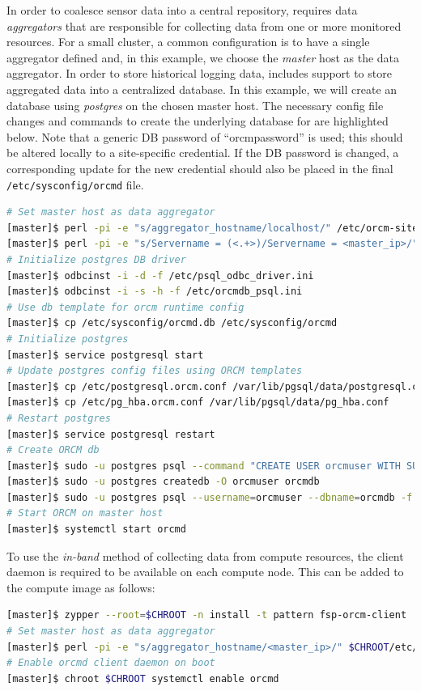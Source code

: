 \documentclass[letterpaper]{article}
\begin{document}
In order to coalesce sensor data into a central repository, \ORCM{} requires
data {\em aggregators} that are responsible for collecting data from one or
more monitored resources. For a small cluster, a common configuration is to
have a single aggregator defined and, in this example, we choose the {\em master} host
as the data aggregator. In order to store historical logging data, \ORCM{}
includes support to store aggregated data into a centralized database. In this
example, we will create an \ORCM{} database using {\em postgres} on the chosen
master host. The necessary config file changes and commands to create the
underlying database for \ORCM{} are highlighted below. Note that a generic DB
password of ``orcmpassword'' is used; this should be altered locally to a
site-specific credential. If the DB password is changed, a corresponding update
for the new credential should also be placed in the final
\texttt{/etc/sysconfig/orcmd} file.

\begin{lstlisting}[language=bash,keywords={},upquote=true]
# Set master host as data aggregator
[master]$ perl -pi -e "s/aggregator_hostname/localhost/" /etc/orcm-site.xml
[master]$ perl -pi -e "s/Servername = (<.+>)/Servername = <master_ip>/" /etc/orcmdb_psql.ini
# Initialize postgres DB driver
[master]$ odbcinst -i -d -f /etc/psql_odbc_driver.ini
[master]$ odbcinst -i -s -h -f /etc/orcmdb_psql.ini 
# Use db template for orcm runtime config
[master]$ cp /etc/sysconfig/orcmd.db /etc/sysconfig/orcmd
# Initialize postgres
[master]$ service postgresql start
# Update postgres config files using ORCM templates
[master]$ cp /etc/postgresql.orcm.conf /var/lib/pgsql/data/postgresql.conf
[master]$ cp /etc/pg_hba.orcm.conf /var/lib/pgsql/data/pg_hba.conf
# Restart postgres
[master]$ service postgresql restart
# Create ORCM db
[master]$ sudo -u postgres psql --command "CREATE USER orcmuser WITH SUPERUSER PASSWORD 'orcmpassword';"
[master]$ sudo -u postgres createdb -O orcmuser orcmdb
[master]$ sudo -u postgres psql --username=orcmuser --dbname=orcmdb -f /etc/orcmdb_psql.sql
# Start ORCM on master host
[master]$ systemctl start orcmd
\end{lstlisting}

To use the {\em in-band} method of collecting data from compute resources, the
\ORCM{} client daemon is required to be available on each compute node. This can
be added to the compute image as follows:

\begin{lstlisting}[language=bash,keywords={},upquote=true]
[master]$ zypper --root=$CHROOT -n install -t pattern fsp-orcm-client
# Set master host as data aggregator
[master]$ perl -pi -e "s/aggregator_hostname/<master_ip>/" $CHROOT/etc/orcm-site.xml
# Enable orcmd client daemon on boot
[master]$ chroot $CHROOT systemctl enable orcmd
\end{lstlisting}
\end{document}
